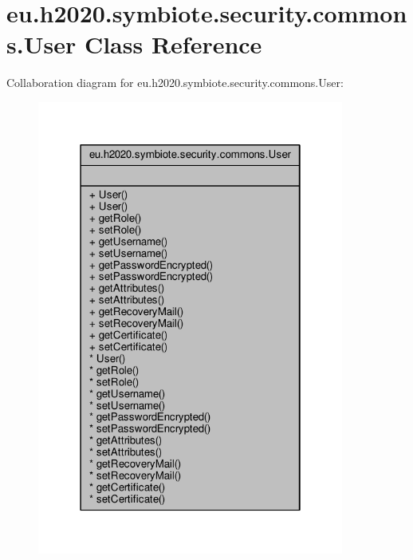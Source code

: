 \hypertarget{classeu_1_1h2020_1_1symbiote_1_1security_1_1commons_1_1User}{}\section{eu.\+h2020.\+symbiote.\+security.\+commons.\+User Class Reference}
\label{classeu_1_1h2020_1_1symbiote_1_1security_1_1commons_1_1User}


Collaboration diagram for eu.\+h2020.\+symbiote.\+security.\+commons.\+User\+:
\nopagebreak
\begin{figure}[H]
\begin{center}
\leavevmode
\includegraphics[width=286pt]{classeu_1_1h2020_1_1symbiote_1_1security_1_1commons_1_1User__coll__graph}
\end{center}
\end{figure}
